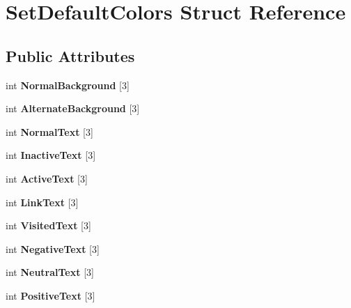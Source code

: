 \hypertarget{struct_set_default_colors}{}\section{Set\+Default\+Colors Struct Reference}
\label{struct_set_default_colors}
\subsection*{Public Attributes}
\begin{DoxyCompactItemize}
\item 
\mbox{\label{struct_set_default_colors_acc60c7cc5bfc5a7e17ae7a0dac06eec5}} 
int {\bfseries Normal\+Background} \mbox{[}3\mbox{]}
\item 
\mbox{\label{struct_set_default_colors_ab5e2b12867d17a561dba1ada678419e1}} 
int {\bfseries Alternate\+Background} \mbox{[}3\mbox{]}
\item 
\mbox{\label{struct_set_default_colors_a86e080bb3bc18adf51acb399fd6f78fc}} 
int {\bfseries Normal\+Text} \mbox{[}3\mbox{]}
\item 
\mbox{\label{struct_set_default_colors_ae50623af26fbb357f230284af869c8dc}} 
int {\bfseries Inactive\+Text} \mbox{[}3\mbox{]}
\item 
\mbox{\label{struct_set_default_colors_afaa8ed71fac0a5bae228c784b5b6f776}} 
int {\bfseries Active\+Text} \mbox{[}3\mbox{]}
\item 
\mbox{\label{struct_set_default_colors_a609f76b5fc914be42d9b813b401891f4}} 
int {\bfseries Link\+Text} \mbox{[}3\mbox{]}
\item 
\mbox{\label{struct_set_default_colors_a2ee6c3f77c0162672a1786381fb1a782}} 
int {\bfseries Visited\+Text} \mbox{[}3\mbox{]}
\item 
\mbox{\label{struct_set_default_colors_a94848e9edec058eec5dcbd92b959f3af}} 
int {\bfseries Negative\+Text} \mbox{[}3\mbox{]}
\item 
\mbox{\label{struct_set_default_colors_afa656b36e1e60d2e0c97bd2782b290ed}} 
int {\bfseries Neutral\+Text} \mbox{[}3\mbox{]}
\item 
\mbox{\label{struct_set_default_colors_a5e17e8937a275b8f37a21d876e12e75d}} 
int {\bfseries Positive\+Text} \mbox{[}3\mbox{]}
\end{DoxyCompactItemize}


